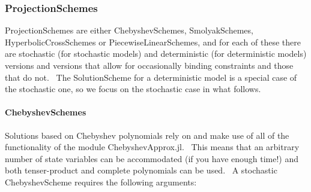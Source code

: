 \documentclass[notitlepage,11pt]{article}
\begin{document}
\subsubsection{ProjectionSchemes}

ProjectionSchemes are either ChebyshevSchemes, SmolyakSchemes,
HyperbolicCrossSchemes or PiecewiseLinearSchemes, and for each of these
there are stochastic (for stochastic models) and deterministic (for
deterministic models) versions and versions that allow for occasionally
binding constraints and those that do not. \ The SolutionScheme for a
deterministic model is a special case of the stochastic one, so we focus on
the stochastic case in what follows.

\paragraph{ChebyshevSchemes}

Solutions based on Chebyshev polynomials rely on and make use of all of the
functionality of the module ChebyshevApprox.jl. \ This means that an
arbitrary number of state variables can be accommodated (if you have enough
time!) and both tenser-product and complete polynomials can be used. \ A
stochastic ChebyshevScheme requires the following arguments:
\end{document}
